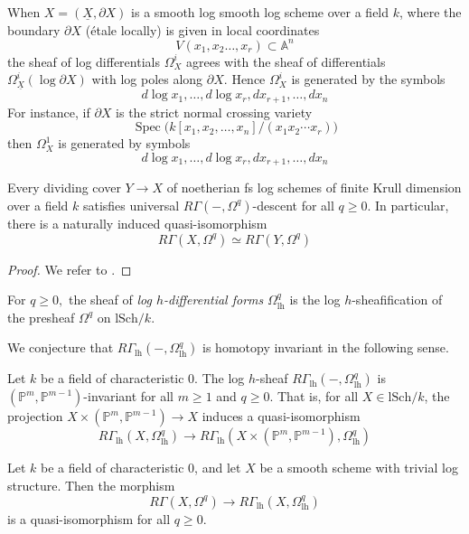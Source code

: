 \documentclass[10pt]{amsart}
\newcommand{\A}{\mathbb{A}}
\renewcommand{\P}{\mathbb{P}}
\DeclareMathOperator{\Spec}{Spec}
\newcommand{\ul}{\underline}
\newcommand{\lh}{\mathrm{lh}}
\newcommand{\lSch}{\mathrm{lSch}}
\begin{document}
\begin{example}\label{exm:smoothdifferentials}
When $X = (\ul{X}, \partial X)$ is a smooth log smooth log scheme over a field $k$, where the boundary $\partial X$ (étale locally) is given in local coordinates 
$$V(x_1, x_2 \hdots, x_r) \subset \A^n$$
the sheaf of log differentials $\Omega^i_X$ agrees with the sheaf of differentials $\Omega^i_{\ul{X}}(\log \partial X)$ with log poles along $\partial X.$
Hence $\Omega^i_X$ is generated by the symbols
\[
d\log x_1, \hdots, d\log x_r, dx_{r+1}, \hdots, dx_n
\]
For instance, if $\partial X$ is the strict normal crossing variety 
$$\Spec{\big( k[x_1, x_2, \hdots, x_n]/(x_1 x_2 \cdots x_r) \big)}$$
then $\Omega^1_X$ is generated by symbols
\[d\log x_1, \hdots, d\log x_r, dx_{r+1}, \hdots, dx_n\]
\end{example}

\begin{proposition}\label{prop:dividingdescent}
Every dividing cover $Y \to X$ of noetherian fs log schemes of finite Krull dimension over a field $k$ satisfies universal $R\Gamma(-,\Omega^q)$-descent for all $q \geq 0.$
In particular, there is a naturally induced quasi-isomorphism
\[
R\Gamma(X,\Omega^q)
\simeq
R\Gamma(Y,\Omega^q)
\]
\end{proposition}
\begin{proof}
We refer to \cite[Corollary 6.17]{BLPO}.
\end{proof}


\begin{definition}
For $q \geq 0,$ 
the sheaf of \textit{log $h$-differential forms} $\Omega^q_{\lh}$ is the log $h$-sheafification of the presheaf $\Omega^q$ on $\lSch/k.$
\end{definition}

We conjecture that $R\Gamma_{\lh}(-,\Omega^q_{\lh})$ is homotopy invariant in the following sense.

\begin{conjecture}\label{conj:loghdifferantialshomotopyinvariant}
Let $k$ be a field of characteristic 0.
The log $h$-sheaf $R\Gamma_{\lh}(-,\Omega^q_{\lh})$ is $(\P^m, \P^{m-1})$-invariant for all $m\geq 1$ and $q\geq 0$.
That is, 
for all $X \in \lSch/k$, 
the projection $X \times (\P^m, \P^{m-1}) \to X$ induces a quasi-isomorphism
$$R\Gamma_{\lh}(X,\Omega^q_{\lh}) \longrightarrow R\Gamma_{\lh}(X \times (\P^m, \P^{m-1}),\Omega^q_{\lh})$$
\end{conjecture}

\begin{conjecture}\label{conj:loghdifferentialsequal}
Let $k$ be a field of characteristic 0, and
let $X$ be a smooth scheme with trivial log structure. Then the morphism
$$R\Gamma(X, \Omega^q) \longrightarrow R\Gamma_{\lh}(X, \Omega^q_{\lh})$$
is a quasi-isomorphism for all $q\geq 0.$
\end{conjecture}
\end{document}
